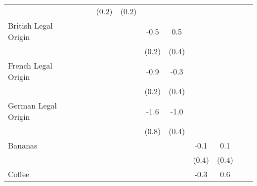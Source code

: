{\begin{tabular}{l*{10}{c}}
                    &                     &                     &       (0.2)         &       (0.2)         &                     &                     &                     &                     &                     &                     \\
British Legal Origin&                     &                     &                     &                     &        -0.5\sym{**} &         0.5         &                     &                     &                     &                     \\
                    &                     &                     &                     &                     &       (0.2)         &       (0.4)         &                     &                     &                     &                     \\
French Legal Origin &                     &                     &                     &                     &        -0.9\sym{***}&        -0.3         &                     &                     &                     &                     \\
                    &                     &                     &                     &                     &       (0.2)         &       (0.4)         &                     &                     &                     &                     \\
German Legal Origin &                     &                     &                     &                     &        -1.6         &        -1.0\sym{*}  &                     &                     &                     &                     \\
                    &                     &                     &                     &                     &       (0.8)         &       (0.4)         &                     &                     &                     &                     \\
Bananas             &                     &                     &                     &                     &                     &                     &        -0.1         &         0.1         &                     &                     \\
                    &                     &                     &                     &                     &                     &                     &       (0.4)         &       (0.4)         &                     &                     \\
Coffee              &                     &                     &                     &                     &                     &                     &        -0.3         &         0.6\sym{*}  &                     &                     \\

\end{tabular}}

